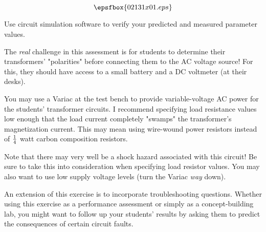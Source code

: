 

$$\epsfbox{02131x01.eps}$$

\vfil \eject






Use circuit simulation software to verify your predicted and measured parameter values.







The {\it real} challenge in this assessment is for students to determine their transformers' "polarities" before connecting them to the AC voltage source!  For this, they should have access to a small battery and a DC voltmeter (at their desks).

You may use a Variac at the test bench to provide variable-voltage AC power for the students' transformer circuits.  I recommend specifying load resistance values low enough that the load current completely "swamps" the transformer's magnetization current.  This may mean using wire-wound power resistors instead of $1 \over 4$ watt carbon composition resistors.

Note that there may very well be a shock hazard associated with this circuit!  Be sure to take this into consideration when specifying load resistor values.  You may also want to use low supply voltage levels (turn the Variac {\it way} down).

An extension of this exercise is to incorporate troubleshooting questions.  Whether using this exercise as a performance assessment or simply as a concept-building lab, you might want to follow up your students' results by asking them to predict the consequences of certain circuit faults.




